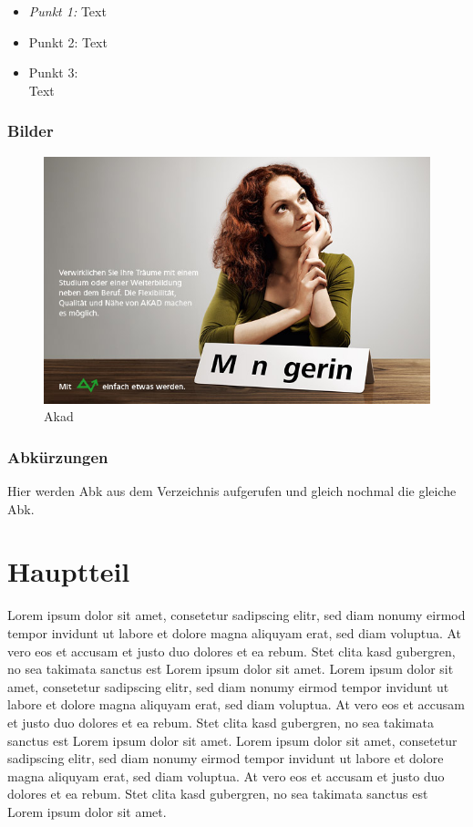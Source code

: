 \documentclass[a4paper,12pt]{article}
\begin{document}
\begin{itemize}
\item\textit{Punkt 1:} Text
\item Punkt 2: Text
\item Punkt 3: \\ Text
\end{itemize}

\subsubsection{Bilder}

\begin{figure}[H]
\begin{center}
\includegraphics[scale=0.5]{akad_bild1.jpg}
\caption{Akad}
\end{center}
\end{figure}

\subsubsection{Abkürzungen}
Hier werden \ac{Abk} aus dem Verzeichnis aufgerufen und gleich nochmal die gleiche \ac{Abk}.

\section{Hauptteil}

Lorem ipsum dolor sit amet, consetetur sadipscing elitr, sed diam nonumy eirmod tempor invidunt ut labore et dolore magna aliquyam erat, sed diam voluptua. At vero eos et accusam et justo duo dolores et ea rebum. Stet clita kasd gubergren, no sea takimata sanctus est Lorem ipsum dolor sit amet. Lorem ipsum dolor sit amet, consetetur sadipscing elitr, sed diam nonumy eirmod tempor invidunt ut labore et dolore magna aliquyam erat, sed diam voluptua. At vero eos et accusam et justo duo dolores et ea rebum. Stet clita kasd gubergren, no sea takimata sanctus est Lorem ipsum dolor sit amet. Lorem ipsum dolor sit amet, consetetur sadipscing elitr, sed diam nonumy eirmod tempor invidunt ut labore et dolore magna aliquyam erat, sed diam voluptua. At vero eos et accusam et justo duo dolores et ea rebum. Stet clita kasd gubergren, no sea takimata sanctus est Lorem ipsum dolor sit amet.   
\end{document}
